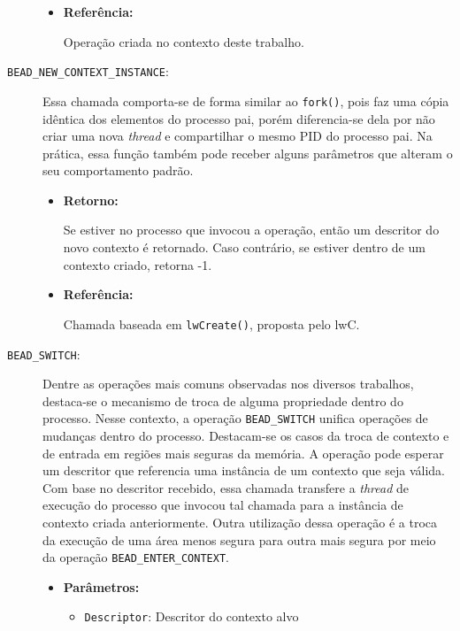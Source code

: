 \begin{description}
\begin{itemize}
    \item \textbf{Referência:}

Operação criada no contexto deste trabalho.

  \end{itemize}

  \item [\texttt{BEAD\_NEW\_CONTEXT\_INSTANCE}:]

Essa chamada comporta-se de forma similar ao \texttt{fork()}, pois
faz uma cópia idêntica dos elementos do processo pai, porém diferencia-se dela
por não criar uma nova \emph{thread} e
compartilhar o mesmo PID do processo pai. Na prática, essa função também pode
receber alguns parâmetros que alteram o seu comportamento padrão.

  \begin{itemize}
    \item \textbf{Retorno:}

Se estiver no processo que invocou a operação, então um descritor do novo
contexto é retornado. Caso contrário, se estiver dentro de um contexto criado,
retorna -1.

    \item \textbf{Referência:}

Chamada baseada em \texttt{lwCreate()}, proposta pelo lwC.

  \end{itemize}

  \item [\texttt{BEAD\_SWITCH}:]

Dentre as operações mais comuns observadas nos diversos trabalhos, destaca-se o
mecanismo de troca de alguma propriedade dentro do processo. Nesse contexto, a
operação \texttt{BEAD\_SWITCH} unifica operações de mudanças dentro do
processo. Destacam-se os casos da troca de contexto e de entrada em regiões
mais seguras da memória. A operação pode esperar um descritor que referencia uma
instância de um contexto que seja válida. Com base no descritor recebido, essa
chamada transfere a \emph{thread} de execução do processo que invocou tal chamada para
a instância de contexto criada anteriormente. Outra utilização dessa operação é
a troca da execução de uma área menos segura para outra mais segura por meio da
operação \texttt{BEAD\_ENTER\_CONTEXT}.

  \begin{itemize}
    \item \textbf{Parâmetros:} 

    \begin{itemize}
      \item \texttt{Descriptor}: Descritor do contexto alvo
    \end{itemize}


\end{itemize}
\end{description}
